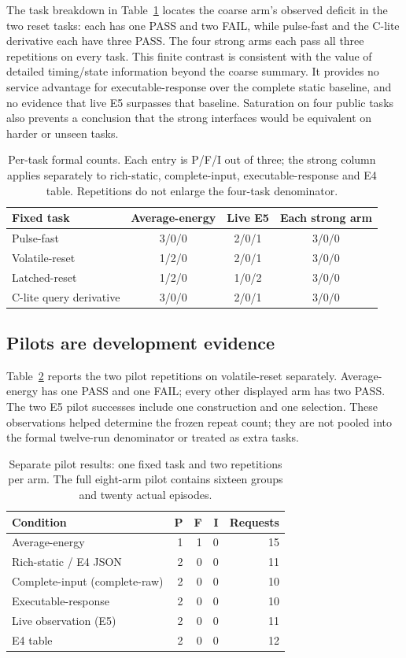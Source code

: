 The task breakdown in Table~\ref{tab:tasks} locates the coarse arm's observed
deficit in the two reset tasks: each has one PASS and two FAIL, while pulse-fast
and the C-lite derivative each have three PASS. The four strong arms each pass
all three repetitions on every task. This finite contrast is consistent with
the value of detailed timing/state information beyond the coarse summary.
It provides no service advantage for executable-response over the complete
static baseline, and no evidence that live E5 surpasses that baseline. Saturation
on four public tasks also prevents a conclusion that the strong interfaces
would be equivalent on harder or unseen tasks.

\begin{table}[htbp]
\centering\small
\caption{Per-task formal counts. Each entry is P/F/I out of three; the strong
column applies separately to rich-static, complete-input, executable-response
and E4 table. Repetitions do not enlarge the four-task denominator.}
\label{tab:tasks}
\begin{tabular}{@{}lccc@{}}\toprule
Fixed task & Average-energy & Live E5 & Each strong arm \\\midrule
Pulse-fast & 3/0/0 & 2/0/1 & 3/0/0 \\
Volatile-reset & 1/2/0 & 2/0/1 & 3/0/0 \\
Latched-reset & 1/2/0 & 1/0/2 & 3/0/0 \\
C-lite query derivative & 3/0/0 & 2/0/1 & 3/0/0 \\
\bottomrule\end{tabular}
\end{table}

\subsection{Pilots are development evidence}
Table~\ref{tab:pilot} reports the two pilot repetitions on volatile-reset
separately. Average-energy has one PASS and one FAIL; every other displayed arm
has two PASS. The two E5 pilot successes include one construction and one
selection. These observations helped determine the frozen repeat count; they
are not pooled into the formal twelve-run denominator or treated as extra tasks.

\begin{table}[htbp]
\centering\small
\caption{Separate pilot results: one fixed task and two repetitions per arm.
The full eight-arm pilot contains sixteen groups and twenty actual episodes.}
\label{tab:pilot}
\begin{tabular}{@{}lrrrr@{}}\toprule
Condition & P & F & I & Requests \\\midrule
Average-energy & 1 & 1 & 0 & 15 \\
Rich-static / E4 JSON & 2 & 0 & 0 & 11 \\
Complete-input (complete-raw) & 2 & 0 & 0 & 10 \\
Executable-response & 2 & 0 & 0 & 10 \\
Live observation (E5) & 2 & 0 & 0 & 11 \\
E4 table & 2 & 0 & 0 & 12 \\
\bottomrule\end{tabular}
\end{table}

